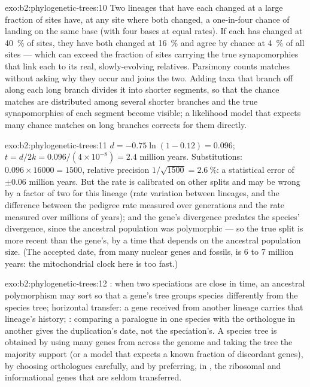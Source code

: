 \begin{solution}{exo:b2:phylogenetic-trees:10}
Two lineages that have each changed at a large fraction of sites
have, at any site where both changed, a one-in-four chance of
landing on the same base (with four bases at equal rates). If each
has changed at \qty{40}{\%} of sites, they have both changed at
\qty{16}{\%} and agree by chance at \qty{4}{\%} of all sites ---
which can exceed the fraction of sites carrying the true
synapomorphies that link each to its real, slowly-evolving
relatives. Parsimony counts matches without asking why they occur
and joins the two. Adding taxa that branch off along each long
branch divides it into shorter segments, so that the chance
matches are distributed among several shorter branches and the
true synapomorphies of each segment become visible; a likelihood
model that expects many chance matches on long branches corrects
for them directly.
\end{solution}

\begin{solution}{exo:b2:phylogenetic-trees:11}
$d = -0.75\ln(1 - 0.12) = 0.096$; $t = d/2k = 0.096/(4\times 10^{-8})
= 2.4$ million years. Substitutions: $0.096\times \num{16000} =
1500$, relative precision $1/\sqrt{1500} = \qty{2.6}{\%}$: a
statistical error of $\pm 0.06$ million years. But the rate is
calibrated on other splits and may be wrong by a factor of two
for this lineage (rate variation between lineages, and the
difference between the pedigree rate measured over generations and
the rate measured over millions of years); and the gene's
divergence predates the species' divergence, since the ancestral
population was polymorphic --- so the true split is more recent
than the gene's, by a time that depends on the ancestral
population size. (The accepted date, from many nuclear genes and
fossils, is 6 to 7 million years: the mitochondrial clock here is
too fast.)
\end{solution}

\begin{solution}{exo:b2:phylogenetic-trees:12}
: when two speciations are close in
time, an ancestral polymorphism may sort so that a gene's tree
groups species differently from the species tree; horizontal
transfer: a gene received from another lineage carries that
lineage's history; : comparing a paralogue in one
species with the orthologue in another gives the duplication's
date, not the speciation's. A species tree is obtained by using
many genes from across the genome and taking the tree the majority
support (or a model that expects a known fraction of discordant
genes), by choosing orthologues carefully, and by preferring, in
, the ribosomal and informational genes that are seldom
transferred.
\end{solution}

